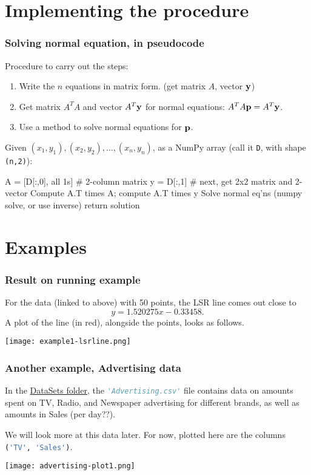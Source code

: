 \documentclass{beamer}
\theoremstyle{example}
\newcommand{\ttt}[1]{{\small\texttt{#1}}}
\begin{document}
\section{Implementing the procedure}

\begin{frame}[fragile]
\frametitle{Solving normal equation, in pseudocode}
Procedure to carry out the steps:
\begin{enumerate}
    \item Write the $n$ equations in matrix form. (get matrix $A$, vector ${\bf y}$)
    \item Get matrix $A^TA$ and vector $A^T{\bf y}$ for normal equations: \mbox{$A^TA{\bf p} = A^T{\bf y}$.}
    \item Use a method to solve normal equations for ${\bf p}$.
\end{enumerate}

\pause
\vspace*{12pt}
Given $(x_1,y_1), (x_2,y_2), \ldots, (x_n, y_n)$, as a NumPy array (call it \ttt{D}, with shape \ttt{(n,2)}): 

\begin{pseudo}
A = [D[:,0], all 1s] # 2-column matrix
y = D[:,1]
# next, get 2x2 matrix and 2-vector
Compute A.T times A; compute A.T times y
Solve normal eq'ns (numpy solve, or use inverse)
return solution 
\end{pseudo}

\end{frame}

\section{Examples}

\begin{frame}
\frametitle{Result on running example}
For the data (linked to above) with 50 points, the LSR line comes out close to
    \[y = 1.520275x - 0.33458.\]
\pause
A plot of the line (in red), alongside the points, looks as follows.

\vspace*{12pt}
\centering
\texttt{[image: example1-lsrline.png]}
\end{frame}

\begin{frame}[fragile]
\frametitle{Another example, Advertising data}
In the \href{https://github.com/cornwell/math371-S25/blob/main/DataSets/}{DataSets folder}, the \lstinline[language=Python, stringstyle=\ttfamily\color{strings}]{'Advertising.csv'} file contains data on amounts spent on TV, Radio, and Newspaper advertising for different brands, as well as amounts in Sales (per day??).

\pause
We will look more at this data later. For now, plotted here are the columns \lstinline[language=Python, stringstyle=\ttfamily\color{strings}]{('TV', 'Sales')}.

\vspace*{12pt}
\centering
\texttt{[image: advertising-plot1.png]}

\end{frame}
\end{document}
